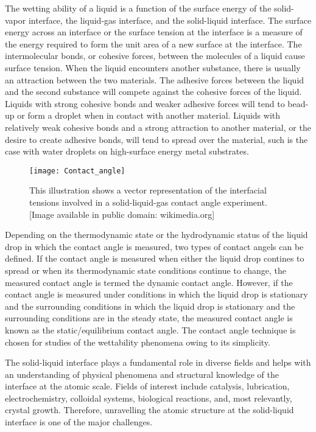  The wetting ability of a liquid is a function of the surface energy of the solid-vapor interface, the liquid-gas interface, and the solid-liquid interface. The surface energy across an interface or the surface tension at the interface is a measure of the energy required to form the unit area of a new surface at the interface. The intermolecular bonds, or cohesive forces, between the molecules of a liquid cause surface tension. When the liquid encounters another substance, there is usually an attraction between the two materials. The adhesive forces between the liquid and the second substance will compete against the cohesive forces of the liquid.  Liquids with strong cohesive bonds and weaker adhesive forces will tend to bead-up or form a droplet when in contact with another material. Liquids with relatively weak cohesive bonds and a strong attraction to another material, or the desire to create adhesive bonds, will tend to spread over the material, such is the case with water droplets on high-surface energy metal substrates.
 
 \begin{wrapfigure}[8]{R}{0.5\linewidth}
 	\centering
 	\texttt{[image: Contact\_angle]}
 	\caption{This illustration shows a vector representation of the interfacial tensions involved in a solid-liquid-gas contact angle experiment. [Image available in public domain: wikimedia.org]}
 	\label{fig:ca-vector}
 \end{wrapfigure}

 Depending on the thermodynamic state or the hydrodynamic status of the liquid drop in which the contact angle is measured, two types of contact angels can be defined. If the contact angle is measured when either the liquid drop contines to spread or when its thermodynamic state conditions continue to change, the measured contact angle is termed the dynamic contact angle. However, if the contact angle is measured under conditions in which the liquid drop is stationary and the surrounding conditions in which the liquid drop is stationary and the surrounding conditions are in the steady state, the measured contact angle is known as the static/equilibrium contact angle. The contact angle technique is chosen for studies of the wettability phenomena owing to its simplicity. 


 The solid-liquid interface plays a fundamental role in diverse fields and helps with an understanding of physical phenomena and structural knowledge of the interface at the atomic scale. Fields of interest include catalysis, lubrication, electrochemistry, colloidal systems, biological reactions, and, most relevantly, crystal growth. Therefore, unravelling the atomic structure at the solid-liquid interface is one of the major challenges. 


